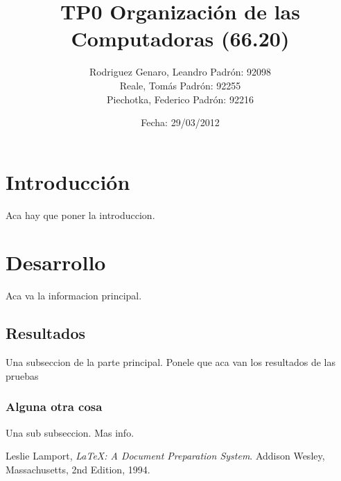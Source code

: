 \documentclass[a4paper,10pt]{report}
\begin{document}
\title{TP0 Organización de las Computadoras (66.20)}
\author{
  Rodriguez Genaro, Leandro	Padrón: 92098\\
  Reale, Tomás			Padrón: 92255\\
  Piechotka, Federico		Padrón: 92216}
\date{Fecha: 29/03/2012}

\maketitle



\section{Introducción}
Aca hay que poner la introduccion.


\section{Desarrollo}
Aca va la informacion principal.

\subsection{Resultados}
Una subseccion de la parte principal. Ponele que aca van los resultados de las pruebas

\subsubsection{Alguna otra cosa}
Una sub subseccion. Mas info.


\begin{thebibliography}{9}

	  Leslie Lamport,
	  \emph{\LaTeX: A Document Preparation System}.
	  Addison Wesley, Massachusetts,
	  2nd Edition,
	  1994.

\end{thebibliography}
\end{document}
